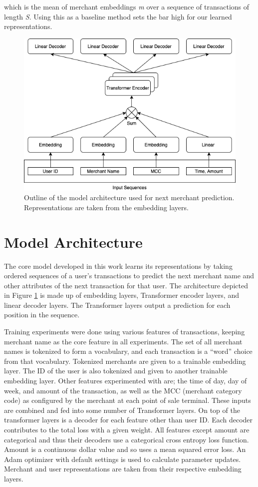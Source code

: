 \documentclass{article}
\begin{document}
which is the mean of merchant embeddings \textit{m} over a sequence of transactions of length \textit{S}. Using this as a baseline method sets the bar high for our learned representations. 

\begin{figure}
  \centering
  \includegraphics[width=.6\linewidth]{tx_sig.png}
  \caption{Outline of the model architecture used for next merchant prediction. Representations are taken from the embedding layers.}
  \label{arch}
\end{figure}

\section{Model Architecture}
The core model developed in this work learns its representations by taking ordered sequences of a user’s transactions to predict the next merchant name and other attributes of the next transaction for that user. The architecture depicted in Figure \ref{arch} is made up of embedding layers, Transformer \cite{Vaswani:2017} encoder layers, and linear decoder layers. The Transformer layers output a prediction for each position in the sequence. 

Training experiments were done using various features of transactions, keeping merchant name as the core feature in all experiments. The set of all merchant names is tokenized to form a vocabulary, and each transaction is a “word” choice from that vocabulary. Tokenized merchants are given to a trainable embedding layer. The ID of the user is also tokenized and given to another trainable embedding layer. Other features experimented with are; the time of day, day of week, and amount of the transaction, as well as the MCC (merchant category code) as configured by the merchant at each point of sale terminal. These inputs are combined and fed into some number of Transformer layers. On top of the transformer layers is a decoder for each feature other than user ID. Each decoder contributes to the total loss with a given weight. All features except amount are categorical and thus their decoders use a categorical cross entropy loss function. Amount is a continuous dollar value and so uses a mean squared error loss. An Adam optimizer with default settings is used to calculate parameter updates. Merchant and user representations are taken from their respective embedding layers.
\end{document}
